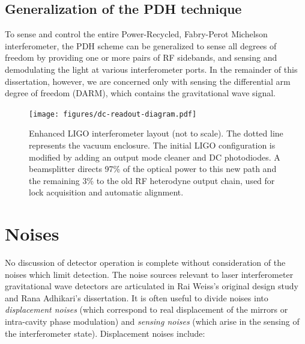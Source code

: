 \subsection{Generalization of the PDH technique}

To sense and control the entire Power-Recycled, Fabry-Perot Michelson
interferometer, the PDH scheme can be generalized to sense all degrees
of freedom by providing one or more pairs of RF sidebands, and sensing
and demodulating the light at various interferometer ports.  In the
remainder of this dissertation, however, we are concerned only with
sensing the differential arm degree of freedom (DARM), which contains
the gravitational wave signal.

\begin{figure}
\texttt{[image: figures/dc-readout-diagram.pdf]}
\caption[Enhanced LIGO interferometer
  layout]{\label{fig:dc-readout-ifo}Enhanced LIGO interferometer
  layout (not to scale).  The dotted line represents the vacuum
  enclosure. The initial LIGO configuration is modified by adding an
  output mode cleaner and DC photodiodes.  A beamsplitter directs 97\%
  of the optical power to this new path and the remaining 3\% to the
  old RF heterodyne output chain, used for lock acquisition and
  automatic alignment.}
\end{figure}

\section{Noises}

No discussion of detector operation is complete without consideration of the
noises which limit detection.  The noise sources relevant to laser
interferometer gravitational wave detectors are articulated in Rai
Weiss's original design study\cite{Weiss1972Electromagnetically} and
Rana Adhikari's dissertation\cite{RanaThesis}.  It is often useful to
divide noises into \emph{displacement noises} (which correspond to
real displacement of the mirrors or intra-cavity phase modulation) and
\emph{sensing noises} (which arise in the sensing of the interferometer 
state).  Displacement noises include:

